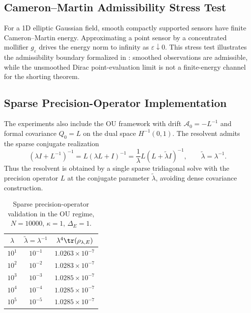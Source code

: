 \subsection{Cameron--Martin Admissibility Stress Test}
\label{supp:cameron_martin_failure}

For a 1D elliptic Gaussian field, smooth compactly supported sensors have finite
Cameron--Martin energy.  Approximating a point sensor by a concentrated
mollifier $g_\varepsilon$ drives the energy norm to infinity as
$\varepsilon\downarrow0$.  This stress test illustrates the admissibility
boundary formalized in : smoothed observations
are admissible, while the unsmoothed Dirac point-evaluation limit is not a
finite-energy channel for the shorting theorem.

\subsection{Sparse Pre\-ci\-sion-Op\-er\-a\-tor Implementation}
\label{supp:sparse_precision}

The experiments also include the OU framework with drift
$\mathcal{A}_0=-L^{-1}$ and formal covariance $Q_0=L$ on the dual space
$H^{-1}(0,1)$.  The resolvent admits the sparse conjugate realization
\[
  (\lambda I+L^{-1})^{-1}
  =L(\lambda L+I)^{-1}
  =
  \frac{1}{\lambda}L(L+\tilde{\lambda}I)^{-1},
  \qquad
  \tilde{\lambda}=\lambda^{-1}.
\]
Thus the resolvent is obtained by a single sparse tridiagonal solve with the
precision operator $L$ at the conjugate parameter $\tilde{\lambda}$, avoiding
dense covariance construction.

\begin{table}[htbp]
  \centering
  \caption{Sparse precision-operator validation in the OU regime, $N=10000$,
  $\kappa=1$, $\Delta_E=1$.}
  \label{tab:supp_sparse_precision}
  \begin{tabular}{ccc}
    \toprule
    $\lambda$ & $\tilde{\lambda}=\lambda^{-1}$ &
    $\lambda^4\tr(\rho_{\lambda,E})$ \\
    \midrule
    $10^1$ & $10^{-1}$ & $1.0263\times10^{-7}$ \\
    $10^2$ & $10^{-2}$ & $1.0283\times10^{-7}$ \\
    $10^3$ & $10^{-3}$ & $1.0285\times10^{-7}$ \\
    $10^4$ & $10^{-4}$ & $1.0285\times10^{-7}$ \\
    $10^5$ & $10^{-5}$ & $1.0285\times10^{-7}$ \\
    \bottomrule
  \end{tabular}
\end{table}

